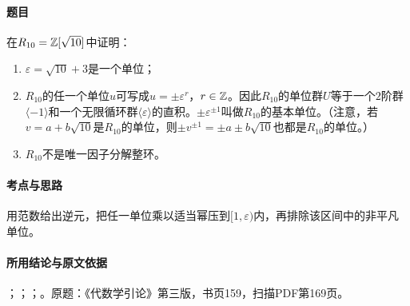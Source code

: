 \label{ex:4:25}

\paragraph{题目}

在$R_{10}=\mathbb Z[\sqrt{10}]$中证明：
\begin{enumerate}[label=(\roman*)]
\item $\varepsilon=\sqrt{10}+3$是一个单位；
\item $R_{10}$的任一个单位$u$可写成$u=\pm\varepsilon^r$，$r\in\mathbb Z$。因此$R_{10}$的单位群$U$等于一个$2$阶群$\langle-1\rangle$和一个无限循环群$\langle\varepsilon\rangle$的直积。$\pm\varepsilon^{\pm1}$叫做$R_{10}$的基本单位。（注意，若$v=a+b\sqrt{10}$是$R_{10}$的单位，则$\pm v^{\pm1}=\pm a\pm b\sqrt{10}$也都是$R_{10}$的单位。）
\item $R_{10}$不是唯一因子分解整环。
\end{enumerate}

\paragraph{考点与思路}

用范数给出逆元，把任一单位乘以适当幂压到$[1,\varepsilon)$内，再排除该区间中的非平凡单位。

\paragraph{所用结论与原文依据}

；；；。原题：《代数学引论》第三版，书页159，扫描PDF第169页。


